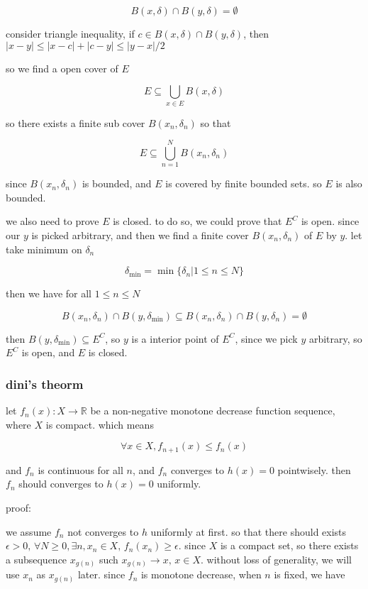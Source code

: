 \documentclass[11pt,a4paper]{article}
\begin{document}
\[
B(x, \delta) \cap B(y, \delta)= \emptyset
\]

consider triangle inequality, if $c \in B(x, \delta) \cap B(y, \delta)$, then $|x-y| \le |x-c| + |c-y| \le |y-x|/2$

so we find a open cover of $E$

\[
E \subseteq \bigcup_{x \in E} B(x, \delta)
\]

so there exists a finite sub cover $B(x_n, \delta_n)$ so that

\[
E \subseteq \bigcup_{n=1}^{N} B(x_n, \delta_n)
\]

since $B(x_n, \delta_n)$ is bounded, and $E$ is covered by finite bounded sets. so $E$ is also bounded.

we also need to prove $E$ is closed. to do so, we could prove that $E^C$ is open. since our $y$ is picked arbitrary, 
and then we find a finite cover $B(x_n, \delta_n)$ of $E$ by $y$. let take minimum on $\delta_n$

\[
\delta_{\min} =  \min \{ \delta_n \vert 1 \le n \le N \}
\]

then we have for all $1 \le n \le N$

\[
B(x_n, \delta_n) \cap B(y, \delta_{\min}) \subseteq B(x_n, \delta_n) \cap B(y, \delta_{n}) = \emptyset
\]

then $B(y, \delta_{\min}) \subseteq E^C$, so $y$ is a interior point of $E^C$, since we pick $y$ arbitrary, so $E^C$ is open, and $E$ is closed.

\subsubsection{dini's theorm}

let $f_n(x): X \to \mathbb{R}$ be a non-negative monotone decrease function sequence, where $X$ is compact. which means

\[
\forall x \in X, f_{n+1}(x) \le f_n(x)
\]

and $f_n$ is continuous for all $n$, and $f_n$ converges to $h(x) = 0$ pointwisely. 
then $f_n$ should converges to $h(x)= 0$ uniformly.

proof:

we assume $f_n$ not converges to $h$ uniformly at first. so that there should exists $\epsilon >0,\, \forall N \ge 0, \exists n, x_n \in X,\, f_n(x_n) \ge \epsilon$.
since $X$ is a compact set, so there exists a subsequence  $x_{g(n)}$ such $x_{g(n)} \to x,\, x \in X$. without loss of generality, we will use $x_n$ as $x_{g(n)}$ later.
since $f_n$ is monotone decrease, when $n$ is fixed, we have
\end{document}
